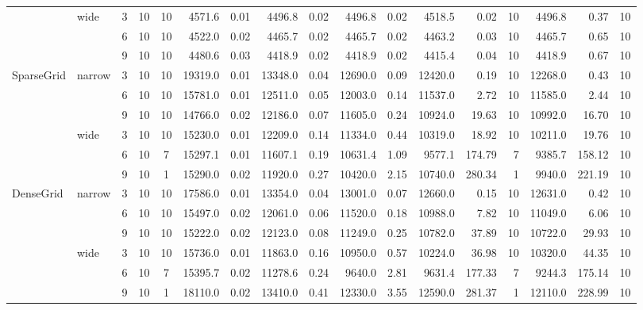 {\begin{table}[tbp]
{\begin{tabular}{llccc|rr|rr|rr|rrr|rrr}
 & wide & 3 & 10 & 10 & 4571.6 & 0.01 & 4496.8 & 0.02 & 4496.8 & 0.02 & 4518.5 & 0.02 & 10 & 4496.8 & 0.37 & 10 \\
 &  & 6 & 10 & 10 & 4522.0 & 0.02 & 4465.7 & 0.02 & 4465.7 & 0.02 & 4463.2 & 0.03 & 10 & 4465.7 & 0.65 & 10 \\
 &  & 9 & 10 & 10 & 4480.6 & 0.03 & 4418.9 & 0.02 & 4418.9 & 0.02 & 4415.4 & 0.04 & 10 & 4418.9 & 0.67 & 10 \\ \cline{1-17}
SparseGrid & narrow & 3 & 10 & 10 & 19319.0 & 0.01 & 13348.0 & 0.04 & 12690.0 & 0.09 & 12420.0 & 0.19 & 10 & 12268.0 & 0.43 & 10 \\
 &  & 6 & 10 & 10 & 15781.0 & 0.01 & 12511.0 & 0.05 & 12003.0 & 0.14 & 11537.0 & 2.72 & 10 & 11585.0 & 2.44 & 10 \\
 &  & 9 & 10 & 10 & 14766.0 & 0.02 & 12186.0 & 0.07 & 11605.0 & 0.24 & 10924.0 & 19.63 & 10 & 10992.0 & 16.70 & 10 \\ \cline{2-17}
 & wide & 3 & 10 & 10 & 15230.0 & 0.01 & 12209.0 & 0.14 & 11334.0 & 0.44 & 10319.0 & 18.92 & 10 & 10211.0 & 19.76 & 10 \\
 &  & 6 & 10 & 7 & 15297.1 & 0.01 & 11607.1 & 0.19 & 10631.4 & 1.09 & 9577.1 & 174.79 & 7 & 9385.7 & 158.12 & 10 \\
 &  & 9 & 10 & 1 & 15290.0 & 0.02 & 11920.0 & 0.27 & 10420.0 & 2.15 & 10740.0 & 280.34 & 1 & 9940.0 & 221.19 & 10 \\ \cline{1-17}
DenseGrid & narrow & 3 & 10 & 10 & 17586.0 & 0.01 & 13354.0 & 0.04 & 13001.0 & 0.07 & 12660.0 & 0.15 & 10 & 12631.0 & 0.42 & 10 \\
 &  & 6 & 10 & 10 & 15497.0 & 0.02 & 12061.0 & 0.06 & 11520.0 & 0.18 & 10988.0 & 7.82 & 10 & 11049.0 & 6.06 & 10 \\
 &  & 9 & 10 & 10 & 15222.0 & 0.02 & 12123.0 & 0.08 & 11249.0 & 0.25 & 10782.0 & 37.89 & 10 & 10722.0 & 29.93 & 10 \\ \cline{2-17}
 & wide & 3 & 10 & 10 & 15736.0 & 0.01 & 11863.0 & 0.16 & 10950.0 & 0.57 & 10224.0 & 36.98 & 10 & 10320.0 & 44.35 & 10 \\
 &  & 6 & 10 & 7 & 15395.7 & 0.02 & 11278.6 & 0.24 & 9640.0 & 2.81 & 9631.4 & 177.33 & 7 & 9244.3 & 175.14 & 10 \\
 &  & 9 & 10 & 1 & 18110.0 & 0.02 & 13410.0 & 0.41 & 12330.0 & 3.55 & 12590.0 & 281.37 & 1 & 12110.0 & 228.99 & 10 \\ \cline{1-17}
\bottomrule
\end{tabular}
}
\end{table}
}
